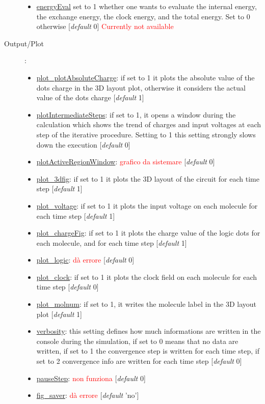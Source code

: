 \documentclass[a4paper,10pt]{article}
\begin{document}
\begin{description}
\begin{itemize}
	\item \underline{energyEval} set to 1 whether one wants to evaluate the internal energy, the exchange energy, the clock energy, and the total energy. Set to 0 otherwise [\textit{default} 0] \textcolor{red}{Currently not available}
	\end{itemize}
\item[Output/Plot]:
	\begin{itemize}
	\item \underline{plot\_plotAbsoluteCharge}: if set to 1 it plots the absolute value of the dots charge in the 3D layout plot, otherwise it considers the actual value of the dots charge [\textit{default} 1] 
	\item \underline{plotIntermediateSteps}: if set to 1, it opens a window during the calculation which shows the trend of charges and input voltages at each step of the iterative procedure. Setting to 1 this setting strongly slows down the execution [\textit{default} 0] 
	\item \underline{plotActiveRegionWindow}: \textcolor{red}{grafico da sistemare} [\textit{default} 0] 
	\item \underline{plot\_3dfig}: if set to 1 it plots the 3D layout of the circuit for each time step [\textit{default} 1] 
	\item \underline{plot\_voltage}: if set to 1 it plots the input voltage on each molecule for each time step [\textit{default} 1] 
	\item \underline{plot\_chargeFig}: if set to 1 it plots the charge value of the logic dots for each molecule, and for each time step [\textit{default} 1] 
	\item \underline{plot\_logic}: \textcolor{red}{dà errore} [\textit{default} 0] 
	\item \underline{plot\_clock}: if set to 1 it plots the clock field on each molecule for each time step [\textit{default} 0]
	\item \underline{plot\_molnum}: if set to 1, it writes the molecule label in the 3D layout plot [\textit{default} 1] 
	\item \underline{verbosity}: this setting defines how much informations are written in the console during the simulation, if set to 0 means that no data are written, if set to 1 the convergence step is written for each time step, if set to 2 convergence info are written for each time step [\textit{default} 0] 
	\item \underline{pauseStep}: \textcolor{red}{non funziona} [\textit{default} 0] 
	\item \underline{fig\_saver}: \textcolor{red}{dà errore} [\textit{default} 'no'] 

\end{itemize}
\end{description}
\end{document}
